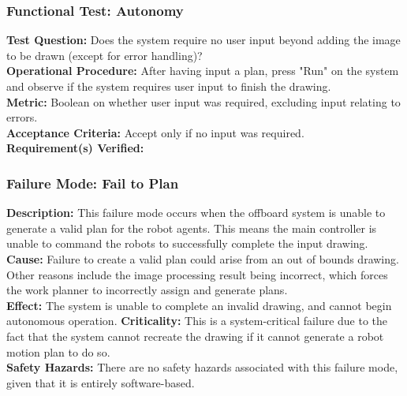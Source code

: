\subsubsection{Functional Test: Autonomy}
\label{test:sdp_ft_autonomy}
\textbf{Test Question:} Does the system require no user input beyond adding the image to be drawn (except for error handling)? \\
\textbf{Operational Procedure:}  After having input a plan, press "Run" on the system and observe if the system requires user input to finish the drawing. \\
\textbf{Metric:} Boolean on whether user input was required, excluding input relating to errors.\\
\textbf{Acceptance Criteria:} Accept only if no input was required.\\
\textbf{Requirement(s) Verified:} 


\subsubsection{Failure Mode: Fail to Plan}
\label{sec:sdp_fm_planning}
\textbf{Description:} This failure mode occurs when the offboard system is unable to generate a valid plan for the robot agents. This means the main controller is unable to command the robots to successfully complete the input drawing.\\
\textbf{Cause:} Failure to create a valid plan could arise from an out of bounds drawing. Other reasons include the image processing result being incorrect, which forces the work planner to incorrectly assign and generate plans.\\
\textbf{Effect:} The system is unable to complete an invalid drawing, and cannot begin autonomous operation.
\textbf{Criticality:} This is a system-critical failure due to the fact that the system cannot recreate the drawing if it cannot generate a robot motion plan to do so. \\
\textbf{Safety Hazards:} There are no safety hazards associated with this failure mode, given that it is entirely software-based. \\